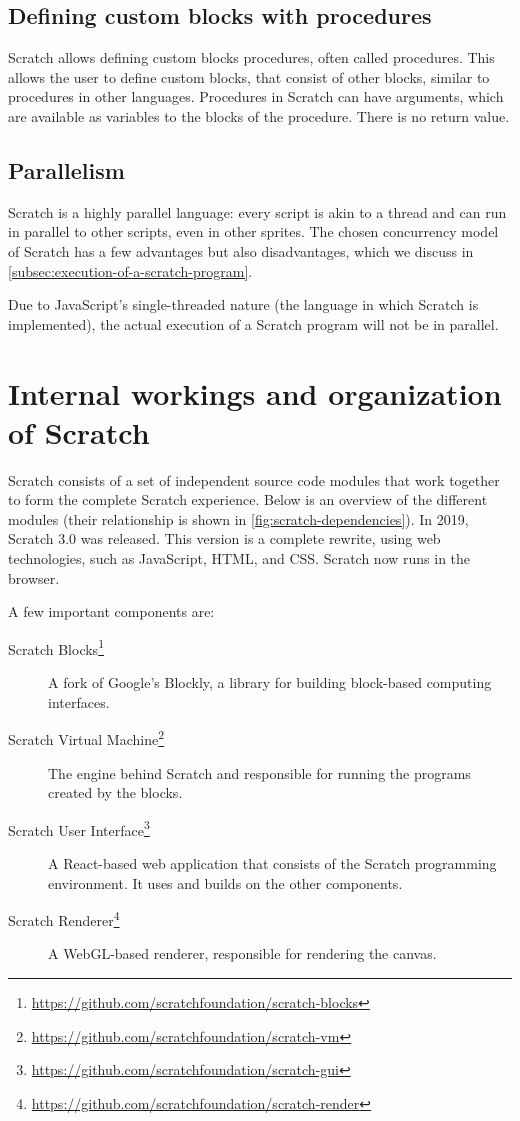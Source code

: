 \documentclass[../main]{subfiles}
\begin{document}
\subsection{Defining custom blocks with procedures}\label{subsec:defining-custom-blocks-with-procedures}

Scratch allows defining \textcolor{scrmoreblocks}{custom blocks} procedures, often called procedures.
This allows the user to define custom blocks, that consist of other blocks, similar to procedures in other languages.
Procedures in Scratch can have arguments, which are available as variables to the blocks of the procedure.
There is no return value.

\subsection{Parallelism}\label{subsec:parallelism}

Scratch is a highly parallel language: every script is akin to a thread and can run in parallel to other scripts, even in other sprites.
The chosen concurrency model of Scratch has a few advantages but also disadvantages, which we discuss in \cref{subsec:execution-of-a-scratch-program}.

Due to JavaScript's single-threaded nature (the language in which Scratch is implemented), the actual execution of a Scratch program will not be in parallel.

\section{Internal workings and organization of Scratch}\label{sec:scratch-internal}

Scratch consists of a set of independent source code modules that work together to form the complete Scratch experience.
Below is an overview of the different modules (their relationship is shown in \cref{fig:scratch-dependencies}).
In 2019, Scratch 3.0 was released.
This version is a complete rewrite, using web technologies, such as JavaScript, HTML, and CSS.
Scratch now runs in the browser.

A few important components are:

\begin{description}
    \item[Scratch Blocks\footnote{\url{https://github.com/scratchfoundation/scratch-blocks}}] A fork of Google's Blockly, a library for building block-based computing interfaces.
    \item[Scratch Virtual Machine\footnote{\url{https://github.com/scratchfoundation/scratch-vm}}] The engine behind Scratch and responsible for running the programs created by the blocks.
    \item[Scratch User Interface\footnote{\url{https://github.com/scratchfoundation/scratch-gui}}] A React-based web application that consists of the Scratch programming environment. It uses and builds on the other components.
    \item[Scratch Renderer\footnote{\url{https://github.com/scratchfoundation/scratch-render}}] A WebGL-based renderer, responsible for rendering the canvas.
\end{description}
\end{document}
